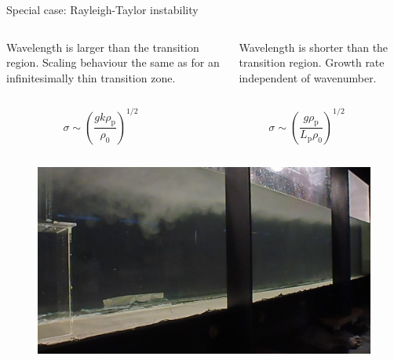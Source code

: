 \documentclass[final]{beamer} %
\begin{document}
\begin{frame}[t]
\begin{block}{Special case: Rayleigh-Taylor instability}
\begin{columns}[t]
\begin{column}{0.3\paperwidth}
        \begin{columns}[c]
          
          \begin{column}{0.15\paperwidth}

            \centering Wavelength is larger than the transition region. Scaling behaviour the same as for an infinitesimally thin transition zone. \\

          \end{column}

          \begin{column}{0.15\paperwidth}

            \centering Wavelength is shorter than the transition region. Growth rate independent of wavenumber. \\

          \end{column}
        \end{columns}

        \vspace{-0.5cm}

        \begin{columns}[c]
          
          \begin{column}{0.15\paperwidth}

            \centering $$\sigma \sim \left(\frac{g k \rho_{\text{p}}}{\rho_{0}}\right)^{1/2}$$
        
          \end{column}

          \begin{column}{0.15\paperwidth}

            \centering $$\sigma \sim \left(\frac{g \rho_{\text{p}}}{L_{\text{p}} \rho_{0}}\right)^{1/2}$$

          \end{column}
        \end{columns}

        \vspace{0.5cm}


        \begin{figure}
          \includegraphics[width=0.3\paperwidth]{exp.jpg}
        \end{figure}


\end{column}
\end{columns}
\end{block}
\end{frame}
\end{document}
